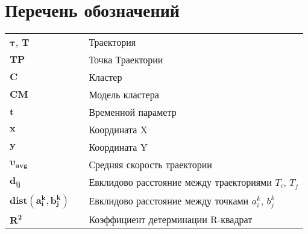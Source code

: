 \section*{Перечень обозначений}
\label{ch:Перечень обозначений}

\begin{tabular}{lll}
	\\
	$\bm{\tau}$, $\bm{T}$       	& & {Траектория} \\[0.5ex]
	$\bm{TP}$        				& & {Точка Траектории} \\[0.5ex]
	$\bm{C}$        				& & {Кластер} \\[0.5ex]
	$\bm{CM}$        				& & {Модель кластера} \\[0.5ex]
	$\bm{t}$						& & {Временной параметр} \\[0.5ex]
	$\bm{x}$						& & {Координата X} \\[0.5ex]
	$\bm{y}$						& & {Координата Y} \\[0.5ex]
	$\bm{\upsilon_{avg}}$			& & {Средняя скорость траектории} \\[0.5ex]
	$\bm{d_{ij}}$					& & {Евклидово расстояние между траекториями $T_i$, $T_j$} \\[0.5ex]
	$\bm{dist(a_i^k, b_j^k)}$		& & {Евклидово расстояние между точками $a_i^k$, $b_j^k$} \\[0.5ex]
	$\bm{R^2}$						& & {Коэффициент детерминации R-квадрат} \\[0.5ex]
	
\end{tabular}
